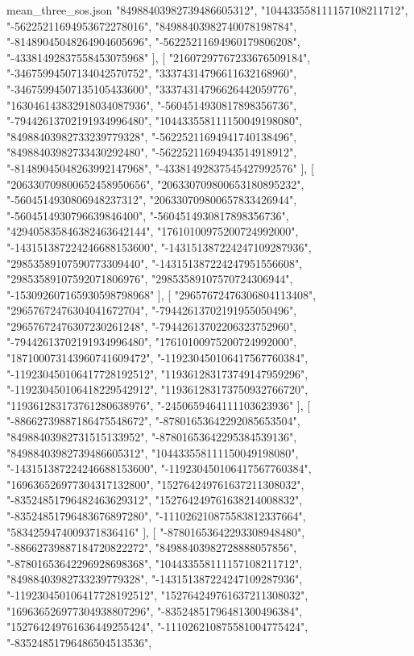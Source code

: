 \begin{filecontents*}[overwrite]{mean_three_sos.json}
    "84988403982739486605312",
    "104433558111157108211712",
    "-56225211694953672278016",
    "84988403982740078198784",
    "-81489045048264904605696",
    "-56225211694960179806208",
    "-43381492837558453075968"
   ],
   [
    "21607297767233676509184",
    "-34675994507134042570752",
    "33374314796611632168960",
    "-34675994507135105433600",
    "33374314796626442059776",
    "163046143832918034087936",
    "-5604514930817898356736",
    "-79442613702191934996480",
    "104433558111150049198080",
    "84988403982733239779328",
    "-56225211694941740138496",
    "84988403982733430292480",
    "-56225211694943514918912",
    "-81489045048263992147968",
    "-43381492837545427992576"
   ],
   [
    "206330709800652458950656",
    "206330709800653180895232",
    "-5604514930806948237312",
    "206330709800657833426944",
    "-5604514930796639846400",
    "-5604514930817898356736",
    "429405835846382463642144",
    "17610100975200724992000",
    "-143151387224246688153600",
    "-143151387224247109287936",
    "29853589107590773309440",
    "-143151387224247951556608",
    "29853589107592071806976",
    "29853589107570724306944",
    "-153092607165930598798968"
   ],
   [
    "29657672476306804113408",
    "29657672476304041672704",
    "-79442613702191955050496",
    "29657672476307230261248",
    "-79442613702206323752960",
    "-79442613702191934996480",
    "17610100975200724992000",
    "187100073143960741609472",
    "-119230450106417567760384",
    "-119230450106417728192512",
    "119361283173749147959296",
    "-119230450106418229542912",
    "119361283173750932766720",
    "119361283173761280638976",
    "-2450659464111103623936"
   ],
   [
    "-88662739887186475548672",
    "-87801653642292085653504",
    "84988403982731515133952",
    "-87801653642295384539136",
    "84988403982739486605312",
    "104433558111150049198080",
    "-143151387224246688153600",
    "-119230450106417567760384",
    "169636526977304317132800",
    "152764249761637211308032",
    "-83524851796482463629312",
    "152764249761638214008832",
    "-83524851796483676897280",
    "-111026210875583812337664",
    "5834259474009371836416"
   ],
   [
    "-87801653642293308948480",
    "-88662739887184720822272",
    "84988403982728888057856",
    "-87801653642296928698368",
    "104433558111157108211712",
    "84988403982733239779328",
    "-143151387224247109287936",
    "-119230450106417728192512",
    "152764249761637211308032",
    "169636526977304938807296",
    "-83524851796481300496384",
    "152764249761636449255424",
    "-111026210875581004775424",
    "-83524851796486504513536",

\end{filecontents*}
